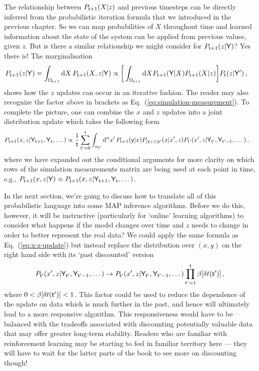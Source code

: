 The relationship between $P_{{\sf t}+1}(X\vert z)$ and previous timesteps can be directly inferred from the probabilistic iteration formula that we introduced in the previous chapter. So we can map probabilities of $X$ throughout time and learned information about the state of the system can be applied from previous values, given $z$. But is there a similar relationship we might consider for $P_{{\sf t}+1}(z\vert {\sf Y})$? Yes there is! The marginalisation
\begin{align} 
P_{{\sf t}+1}(z\vert {\sf Y}) = \int_{\Omega_{{\sf t}+1}} {\rm d}X \, P_{{\sf t}+1}(X,z\vert {\sf Y}) &\propto \bigg[ \int_{\Omega_{{\sf t}+1}} {\rm d}X P_{{\sf t}+1}({\sf Y}\vert X) P_{{\sf t}+1}(X\vert z) \bigg] P_{{\sf t}}(z\vert {\sf Y}') \label{eq:z-update}\,,
\end{align}
shows how the $z$ updates can occur in an iterative fashion. The reader may also recognize the factor above in brackets as Eq.~(\ref{eq:simulation-measurement}). To complete the picture, one can combine the $x$ and $z$ updates into a joint distribution update which takes the following form 
\begin{align} 
P_{{\sf t}+1}(x,z\vert {\sf Y}_{{\sf t}+1}, {\sf Y}_{{\sf t}}, \dots ) &\propto \frac{1}{{\sf t}}\sum_{{\sf t}'=0}^{{\sf t}}\int_{\omega_{{\sf t}'}} {\rm d}^nx' \, P_{{\sf t}+1}({\sf y}\vert x) P_{({\sf t}+1){\sf t}'}(x\vert x', z) P_{{\sf t}'}(x',z\vert {\sf Y}_{{\sf t}'}, {\sf Y}_{{\sf t}'-1}, \dots) \label{eq:x-z-update}\,,
\end{align}
where we have expanded out the conditional arguments for more clarity on which rows of the simulation measurements matrix are being used at each point in time, e.g., $P_{{\sf t}+1}(x,z \vert {\sf Y}) \equiv P_{{\sf t}+1}(x,z \vert {\sf Y}_{{\sf t}+1}, {\sf Y}_{{\sf t}}, \dots)$.

In the next section, we're going to discuss how to translate all of this probabilistic language into some MAP inference algorithms. Before we do this, however, it will be instructive (particularly for `online' learning algorithms) to consider what happens if the model changes over time and $z$ needs to change in order to better represent the real data? We could apply the same formula as Eq.~(\ref{eq:x-z-update}) but instead replace the distribution over $(x,y)$ on the right hand side with its `past discounted' version 
\begin{align}
P_{{\sf t}'}(x',z\vert {\sf Y}_{{\sf t}'}, {\sf Y}_{{\sf t}'-1}, \dots) \rightarrow P_{{\sf t}'}(x',z\vert {\sf Y}_{{\sf t}'}, {\sf Y}_{{\sf t}'-1}, \dots)\prod_{{\sf t}'=1}^{{\sf t}} \beta [\delta t({\sf t}')] \,,
\end{align}
where $0 < \beta [\delta t({\sf t}')] < 1$. This factor could be used to reduce the dependence of the update on data which is much further in the past, and hence will ultimately lead to a more responsive algorithm. This responsiveness would have to be balanced with the tradeoffs associated with discounting potentially valuable data that may offer greater long-term stability. Readers who are familiar with reinforcement learning may be starting to feel in familiar territory here --- they will have to wait for the latter parts of the book to see more on discounting though!


